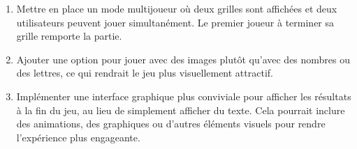 \documentclass[a4paper,10pt]{article}
\begin{document}
\begin{enumerate}
    \item Mettre en place un mode multijoueur où deux grilles sont affichées et deux utilisateurs peuvent jouer simultanément. Le premier joueur à terminer sa grille remporte la partie.
    
    \item Ajouter une option pour jouer avec des images plutôt qu'avec des nombres ou des lettres, ce qui rendrait le jeu plus visuellement attractif.
    
    \item Implémenter une interface graphique plus conviviale pour afficher les résultats à la fin du jeu, au lieu de simplement afficher du texte. Cela pourrait inclure des animations, des graphiques ou d'autres éléments visuels pour rendre l'expérience plus engageante.
\end{enumerate}
\end{document}
